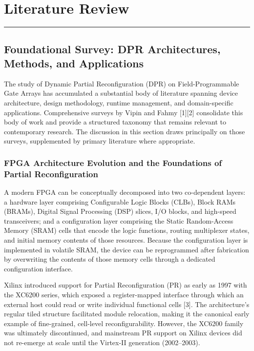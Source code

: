 \chapter{Literature Review}

\vspace{0.4em}\hrule\vspace{0.4em}

\section{Foundational Survey: DPR Architectures, Methods, and Applications}

The study of Dynamic Partial Reconfiguration (DPR) on Field-Programmable Gate Arrays has accumulated a substantial body of literature spanning device architecture, design methodology, runtime management, and domain-specific applications. Comprehensive surveys by Vipin and Fahmy [1][2] consolidate this body of work and provide a structured taxonomy that remains relevant to contemporary research. The discussion in this section draws principally on those surveys, supplemented by primary literature where appropriate.

\subsection{FPGA Architecture Evolution and the Foundations of Partial Reconfiguration}

A modern FPGA can be conceptually decomposed into two co-dependent layers: a hardware layer comprising Configurable Logic Blocks (CLBs), Block RAMs (BRAMs), Digital Signal Processing (DSP) slices, I/O blocks, and high-speed transceivers; and a configuration layer comprising the Static Random-Access Memory (SRAM) cells that encode the logic functions, routing multiplexer states, and initial memory contents of those resources. Because the configuration layer is implemented in volatile SRAM, the device can be reprogrammed after fabrication by overwriting the contents of those memory cells through a dedicated configuration interface.

Xilinx introduced support for Partial Reconfiguration (PR) as early as 1997 with the XC6200 series, which exposed a register-mapped interface through which an external host could read or write individual functional cells [3]. The architecture's regular tiled structure facilitated module relocation, making it the canonical early example of fine-grained, cell-level reconfigurability. However, the XC6200 family was ultimately discontinued, and mainstream PR support on Xilinx devices did not re-emerge at scale until the Virtex-II generation (2002–2003).

